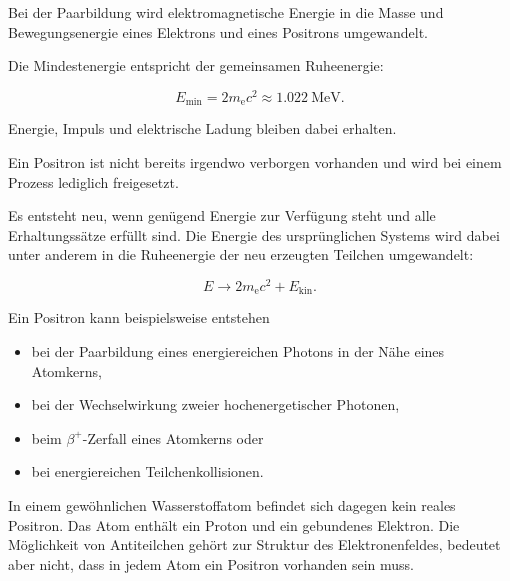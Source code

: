 \begin{PhysicsBox}
	\label{box:energie_wird_zu_materie}
	
	Bei der Paarbildung wird elektromagnetische Energie in die Masse und
	Bewegungsenergie eines Elektrons und eines Positrons umgewandelt.
	
	Die Mindestenergie entspricht der gemeinsamen Ruheenergie:
	
	\begin{equation}
		E_{\mathrm{min}}
		=
		2m_{\mathrm e}c^2
		\approx
		\SI{1.022}{\mega\electronvolt}.
	\end{equation}
	
	Energie, Impuls und elektrische Ladung bleiben dabei erhalten.
\end{PhysicsBox}
\begin{DidacticBox}
	\label{box:wo_entsteht_ein_antiteilchen}
	
	Ein Positron ist nicht bereits irgendwo verborgen vorhanden und wird
	bei einem Prozess lediglich freigesetzt.
	
	Es entsteht neu, wenn genügend Energie zur Verfügung steht und alle
	Erhaltungssätze erfüllt sind. Die Energie des ursprünglichen Systems
	wird dabei unter anderem in die Ruheenergie der neu erzeugten Teilchen
	umgewandelt:
	
	\begin{equation}
		E
		\longrightarrow
		2m_{\mathrm e}c^2
		+
		E_{\mathrm{kin}}.
	\end{equation}
	
	Ein Positron kann beispielsweise entstehen
	
	\begin{itemize}
		\item bei der Paarbildung eines energiereichen Photons in der Nähe
		eines Atomkerns,
		\item bei der Wechselwirkung zweier hochenergetischer Photonen,
		\item beim \(\beta^+\)-Zerfall eines Atomkerns oder
		\item bei energiereichen Teilchenkollisionen.
	\end{itemize}
	
	In einem gewöhnlichen Wasserstoffatom befindet sich dagegen kein reales
	Positron. Das Atom enthält ein Proton und ein gebundenes Elektron. Die
	Möglichkeit von Antiteilchen gehört zur Struktur des Elektronenfeldes,
	bedeutet aber nicht, dass in jedem Atom ein Positron vorhanden sein
	muss.
\end{DidacticBox}
